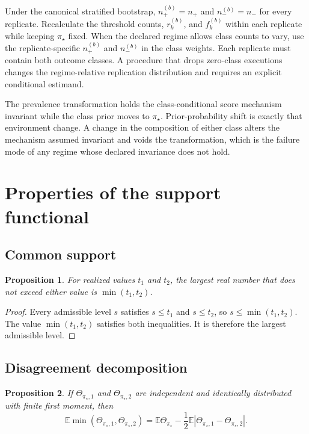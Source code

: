 \documentclass[11pt]{article}
\newcommand{\E}{\mathbb{E}}
\newtheorem{proposition}{Proposition}
\theoremstyle{remark}
\begin{document}
Under the canonical stratified bootstrap, $n_+^{(b)}=n_+$ and $n_-^{(b)}=n_-$ for every replicate. Recalculate the threshold counts, $r_k^{(b)}$, and $f_k^{(b)}$ within each replicate while keeping $\pi_\star$ fixed. When the declared regime allows class counts to vary, use the replicate-specific $n_+^{(b)}$ and $n_-^{(b)}$ in the class weights. Each replicate must contain both outcome classes. A procedure that drops zero-class executions changes the regime-relative replication distribution and requires an explicit conditional estimand.

The prevalence transformation holds the class-conditional score mechanism invariant while the class prior moves to $\pi_\star$. Prior-probability shift is exactly that environment change. A change in the composition of either class alters the mechanism assumed invariant and voids the transformation, which is the failure mode of any regime whose declared invariance does not hold.

\section{Properties of the support functional}
\label{app:properties}

\subsection{Common support}

\begin{proposition}
For realized values $t_1$ and $t_2$, the largest real number that does not exceed either value is $\min(t_1,t_2)$.
\end{proposition}

\begin{proof}
Every admissible level $s$ satisfies $s\leq t_1$ and $s\leq t_2$, so $s\leq\min(t_1,t_2)$. The value $\min(t_1,t_2)$ satisfies both inequalities. It is therefore the largest admissible level.
\end{proof}

\subsection{Disagreement decomposition}

\begin{proposition}
If $\Theta_{\pi_\star,1}$ and $\Theta_{\pi_\star,2}$ are independent and identically distributed with finite first moment, then
\[
\E\min(\Theta_{\pi_\star,1},\Theta_{\pi_\star,2})
=
\E\Theta_{\pi_\star}
-
\frac12
\E|\Theta_{\pi_\star,1}-\Theta_{\pi_\star,2}|.
\]
\end{proposition}
\end{document}
